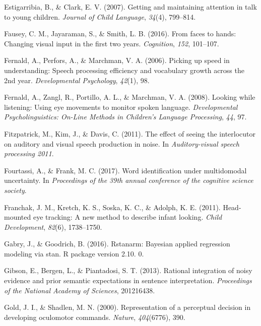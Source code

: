 \documentclass[,man,floatsintext]{apa6}
\begin{document}
\leavevmode\hypertarget{ref-estigarribia2007getting}{}%
Estigarribia, B., \& Clark, E. V. (2007). Getting and maintaining attention in talk to young children. \emph{Journal of Child Language}, \emph{34}(4), 799--814.

\leavevmode\hypertarget{ref-fausey2016faces}{}%
Fausey, C. M., Jayaraman, S., \& Smith, L. B. (2016). From faces to hands: Changing visual input in the first two years. \emph{Cognition}, \emph{152}, 101--107.

\leavevmode\hypertarget{ref-fernald2006picking}{}%
Fernald, A., Perfors, A., \& Marchman, V. A. (2006). Picking up speed in understanding: Speech processing efficiency and vocabulary growth across the 2nd year. \emph{Developmental Psychology}, \emph{42}(1), 98.

\leavevmode\hypertarget{ref-fernald2008looking}{}%
Fernald, A., Zangl, R., Portillo, A. L., \& Marchman, V. A. (2008). Looking while listening: Using eye movements to monitor spoken language. \emph{Developmental Psycholinguistics: On-Line Methods in Children's Language Processing}, \emph{44}, 97.

\leavevmode\hypertarget{ref-fitzpatrick2011effect}{}%
Fitzpatrick, M., Kim, J., \& Davis, C. (2011). The effect of seeing the interlocutor on auditory and visual speech production in noise. In \emph{Auditory-visual speech processing 2011}.

\leavevmode\hypertarget{ref-fourtassiword2018}{}%
Fourtassi, A., \& Frank, M. C. (2017). Word identification under multidomodal uncertainty. In \emph{Proceedings of the 39th annual conference of the cognitive science society}.

\leavevmode\hypertarget{ref-franchak2011head}{}%
Franchak, J. M., Kretch, K. S., Soska, K. C., \& Adolph, K. E. (2011). Head-mounted eye tracking: A new method to describe infant looking. \emph{Child Development}, \emph{82}(6), 1738--1750.

\leavevmode\hypertarget{ref-gabry2016rstanarm}{}%
Gabry, J., \& Goodrich, B. (2016). Rstanarm: Bayesian applied regression modeling via stan. R package version 2.10. 0.

\leavevmode\hypertarget{ref-gibson2013rational}{}%
Gibson, E., Bergen, L., \& Piantadosi, S. T. (2013). Rational integration of noisy evidence and prior semantic expectations in sentence interpretation. \emph{Proceedings of the National Academy of Sciences}, 201216438.

\leavevmode\hypertarget{ref-gold2000representation}{}%
Gold, J. I., \& Shadlen, M. N. (2000). Representation of a perceptual decision in developing oculomotor commands. \emph{Nature}, \emph{404}(6776), 390.
\end{document}
